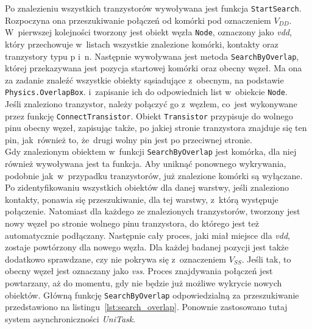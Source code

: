 

Po znalezieniu wszystkich tranzystorów wywoływana jest funkcja \texttt{StartSearch}.
Rozpoczyna ona przeszukiwanie połączeń od komórki pod oznaczeniem $V_{DD}$.
W~pierwszej kolejności tworzony jest obiekt węzła \texttt{Node}, oznaczony jako \textit{vdd},
który przechowuje w~listach wszystkie znalezione komórki,
kontakty oraz tranzystory typu p i~n.
Następnie wywoływana jest metoda \texttt{SearchByOverlap},
której przekazywana jest pozycja startowej komórki oraz obecny węzeł.
Ma ona za zadanie znaleźć wszystkie obiekty sąsiadujące z~obecnym,
na podstawie \texttt{Physics.OverlapBox}.
i~zapisanie ich do odpowiednich list w~obiekcie \texttt{Node}.\\
\indent Jeśli znaleziono tranzystor, należy połączyć go z~węzłem,
co~jest wykonywane przez funkcję \texttt{ConnectTransistor}.
Obiekt \texttt{Transistor} przypisuje do wolnego pinu obecny węzeł,
zapisując także, po jakiej stronie tranzystora znajduje się ten pin,
jak~również to, że~drugi wolny pin jest po przeciwnej stronie.\\
\indent Gdy znalezionym obiektem w~funkcji \texttt{SearchByOverlap} jest komórka,
dla niej również wywoływana jest ta funkcja. %
Aby uniknąć ponownego wykrywania, podobnie jak~w~przypadku tranzystorów,
już znalezione komórki są wyłączane.\\
\indent Po zidentyfikowaniu wszystkich obiektów dla danej warstwy,
jeśli znaleziono kontakty, ponawia się przeszukiwanie, dla tej warstwy, z~którą występuje połączenie.
Natomiast dla każdego ze znalezionych tranzystorów,
tworzony jest nowy węzeł po stronie wolnego pinu tranzystora,
do którego jest też automatycznie podłączany.
Następnie cały proces, jaki miał miejsce dla \textit{vdd}, zostaje powtórzony dla nowego węzła.
Dla każdej badanej pozycji jest także dodatkowo sprawdzane, czy nie pokrywa się z~oznaczeniem $V_{SS}$.
Jeśli tak, to obecny węzeł jest oznaczany jako \textit{vss}.
Proces znajdywania połączeń jest powtarzany, aż do momentu,
gdy nie będzie już możliwe wykrycie nowych obiektów.
Główną funkcję \texttt{SearchByOverlap} odpowiedzialną za przeszukiwanie przedstawiono na listingu~\ref{lst:search_overlap}.
Ponownie zastosowano tutaj system asynchroniczności \textit{UniTask}.



